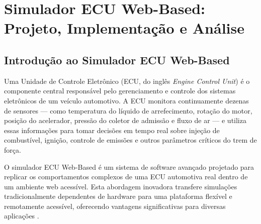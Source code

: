 

\chapter{Simulador ECU Web-Based: Projeto, Implementação e Análise}
\label{chap:simulador-ecu}

\section{Introdução ao Simulador ECU Web-Based}
\label{sec:introducao}

Uma Unidade de Controle Eletrônico (ECU, do inglês \textit{Engine Control Unit}) é o componente central responsável pelo gerenciamento e controle dos sistemas eletrônicos de um veículo automotivo. A ECU monitora continuamente dezenas de sensores --- como temperatura do líquido de arrefecimento, rotação do motor, posição do acelerador, pressão do coletor de admissão e fluxo de ar --- e utiliza essas informações para tomar decisões em tempo real sobre injeção de combustível, ignição, controle de emissões e outros parâmetros críticos do trem de força.

O simulador ECU Web-Based é um sistema de software avançado projetado para replicar os comportamentos complexos de uma ECU automotiva real dentro de um ambiente web acessível. Esta abordagem inovadora transfere simulações tradicionalmente dependentes de hardware para uma plataforma flexível e remotamente acessível, oferecendo vantagens significativas para diversas aplicações \cite{sae_j1979, elm327_datasheet}.

